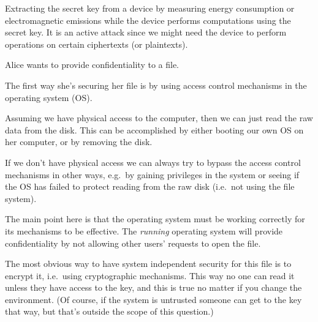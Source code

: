 \begin{solution}
  Extracting the secret key from a device by measuring energy consumption or 
  electromagnetic emissions while the device performs computations using the 
  secret key.
  It is an active attack since we might need the device to perform operations 
  on certain ciphertexts (or plaintexts).
\end{solution}


\question[3]
  Alice wants to provide confidentiality to a file.

  \begin{solution}
    The first way she's securing her file is by using access control mechanisms 
    in the operating system (OS).

    Assuming we have physical access to the computer, then we can just read the 
    raw data from the disk.
    This can be accomplished by either booting our own OS on her computer, or 
    by removing the disk.

    If we don't have physical access we can always try to bypass the access 
    control mechanisms in other ways, e.g.\ by gaining privileges in the system 
    or seeing if the OS has failed to protect reading from the raw disk (i.e.\ 
    not using the file system).

    The main point here is that the operating system must be working correctly 
    for its mechanisms to be effective.
    The \emph{running} operating system will provide confidentiality by not 
    allowing other users' requests to open the file.

    The most obvious way to have system independent security for this file is 
    to encrypt it, i.e.~using cryptographic mechanisms.
    This way no one can read it unless they have access to the key, and this is 
    true no matter if you change the environment.
    (Of course, if the system is untrusted someone can get to the key that way, 
    but that's outside the scope of this question.)
  \end{solution}


  
